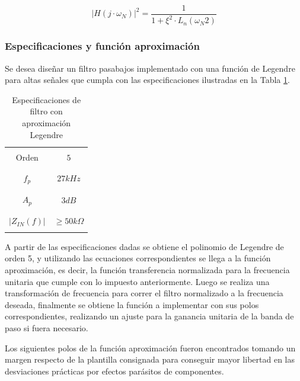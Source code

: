 \begin{equation}
    |H(j \cdot \omega_N)|^{2} = \frac{1}{1 + \xi^{2} \cdot L_n(\omega_N{2})}
\end{equation}

\subsubsection{Especificaciones y funci\'on aproximaci\'on}
Se desea dise\~nar un filtro pasabajos implementado con una funci\'on de Legendre para altas se\~nales que cumpla con las especificaciones
ilustradas en la Tabla \ref{table:especificaciones_legendre}.

\begin{table}[H]
    \centering
    \begin{tabular}{c | c}
        \hline \\
        Orden & $5$ \\
        \\ \hline \\
        $f_p$ & $27kHz$ \\
        \\ \hline \\
        $A_p$ & $3 dB$ \\
        \\ \hline \\
        $|Z_{IN}(f)|$ & $\geq 50k \Omega$ \\ 
        \\ \hline
    \end{tabular}
    \caption{Especificaciones de filtro con aproximaci\'on Legendre}
    \label{table:especificaciones_legendre}
\end{table}

A partir de las especificaciones dadas se obtiene el polinomio de Legendre de orden 5, y utilizando las ecuaciones correspondientes se llega a la funci\'on aproximaci\'on, es decir, la funci\'on
transferencia normalizada para la frecuencia unitaria que cumple con lo impuesto anteriormente. Luego se realiza una transformaci\'on de frecuencia para correr el filtro normalizado a la frecuencia deseada,
finalmente se obtiene la funci\'on a implementar con sus polos correspondientes, realizando un ajuste para la ganancia unitaria de la banda de paso si fuera necesario.

Los siguientes polos de la funci\'on aproximaci\'on fueron encontrados tomando un margen respecto de la plantilla consignada para conseguir mayor libertad en las desviaciones pr\'acticas por efectos par\'asitos de componentes.


